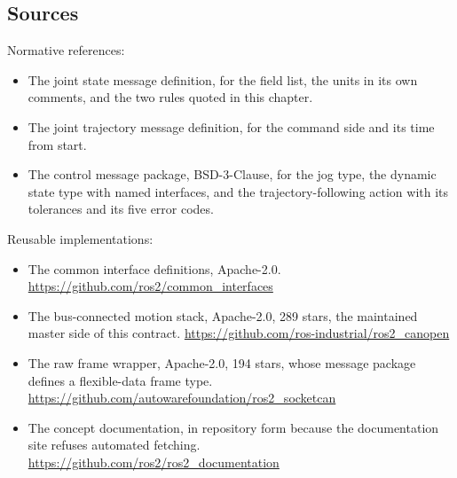 \subsection*{Sources}

Normative references:
\begin{itemize}
\item The joint state message definition, for the field list, the units in its
own comments, and the two rules quoted in this chapter.
\item The joint trajectory message definition, for the command side and its time
from start.
\item The control message package, BSD-3-Clause, for the jog type, the dynamic
state type with named interfaces, and the trajectory-following action with its
tolerances and its five error codes.
\end{itemize}

Reusable implementations:
\begin{itemize}
\item The common interface definitions, Apache-2.0.\newline
\url{https://github.com/ros2/common_interfaces}
\item The bus-connected motion stack, Apache-2.0, 289 stars, the maintained
master side of this contract.\newline
\url{https://github.com/ros-industrial/ros2_canopen}
\item The raw frame wrapper, Apache-2.0, 194 stars, whose message package defines
a flexible-data frame type.\newline
\url{https://github.com/autowarefoundation/ros2_socketcan}
\item The concept documentation, in repository form because the documentation
site refuses automated fetching.\newline
\url{https://github.com/ros2/ros2_documentation}
\end{itemize}
